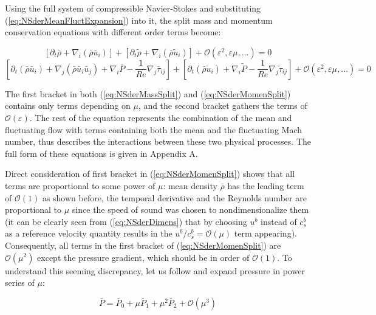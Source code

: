 Using the full system of compressible Navier-Stokes and substituting (\ref{eq:NSderMeanFluctExpansion}) into it, the split mass and momentum conservation equations with different order terms become:

\begin{equation}
\label{eq:NSderMassSplit}
\left[ \partial_t  \bar{\rho} + \nabla_i (\bar{\rho} \bar{u}_i) \right] + \left[ \partial_t  \tilde{\rho} + \nabla_i (\bar{\rho} \tilde{u}_i) \right] + \mathcal{O}(\varepsilon^2, \varepsilon \mu, \dots) = 0
\end{equation}
\begin{equation}
\label{eq:NSderMomenSplit}
\left[ \partial_t  (\bar{\rho} \bar{u}_i) + \nabla_j (\bar{\rho} \bar{u}_i\bar{u}_j) + \nabla_i \bar{P} - \frac{1}{Re} \nabla_j \bar{\tau}_{ij} \right] + \left[ \partial_t (\bar{\rho} \tilde{u}_i) + \nabla_i \tilde{P} - \frac{1}{Re} \nabla_j \tilde{\tau}_{ij} \right] +  \mathcal{O}(\varepsilon^2, \varepsilon \mu, \dots) = 0
\end{equation}

The first bracket in both (\ref{eq:NSderMassSplit}) and (\ref{eq:NSderMomenSplit}) contains only terms depending on $\mu$, and the second bracket gathers the terms of $\mathcal{O}(\varepsilon)$. The rest of the equation represents the combination of the mean and fluctuating flow with terms containing both the mean and the fluctuating Mach number, thus describes the interactions between these two physical processes. The full form of these equations is given in Appendix A.

Direct consideration of first bracket in (\ref{eq:NSderMomenSplit}) shows that all terms are proportional to some power of $\mu$: mean density $\bar{\rho}$ has the leading term of $\mathcal{O}(1)$ as shown before, the temporal derivative and the Reynolds number are proportional to $\mu$ since the speed of sound was chosen to nondimensionalize them (it can be clearly seen from (\ref{eq:NSderDimens}) that by choosing $u^b$ instead of $c_s^b$ as a reference velocity quantity results in the $u^b/c_s^b = \mathcal{O}(\mu)$ term appearing). Consequently, all terms in the first bracket of (\ref{eq:NSderMomenSplit}) are $\mathcal{O}(\mu^2)$ except the pressure gradient, which should be in order of $\mathcal{O}(1)$. To understand this seeming discrepancy, let us follow \cite{Muller99lowmach} and expand pressure in power series of $\mu$:

\begin{equation}
\bar{P} = \bar{P}_0 + \mu \bar{P}_1 + \mu^2 \bar{P}_2 + \mathcal{O}(\mu^3)
\end{equation}

